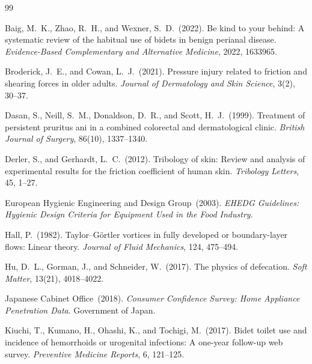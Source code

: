 \documentclass[aps,prfluids,reprint,amsmath,amssymb,floatfix]{revtex4-2}
\begin{document}
\begin{thebibliography}{99}

Baig, M.~K., Zhao, R.~H., and Wexner, S.~D.\ (2022).
Be kind to your behind: A systematic review of the habitual use of bidets
in benign perianal disease.
\textit{Evidence-Based Complementary and Alternative Medicine}, 2022, 1633965.

Broderick, J.~E., and Cowan, L.~J.\ (2021).
Pressure injury related to friction and shearing forces in older adults.
\textit{Journal of Dermatology and Skin Science}, 3(2), 30--37.

Dasan, S., Neill, S.~M., Donaldson, D.~R., and Scott, H.~J.\ (1999).
Treatment of persistent pruritus ani in a combined colorectal and
dermatological clinic.
\textit{British Journal of Surgery}, 86(10), 1337--1340.

Derler, S., and Gerhardt, L.~C.\ (2012).
Tribology of skin: Review and analysis of experimental results for the
friction coefficient of human skin.
\textit{Tribology Letters}, 45, 1--27.

European Hygienic Engineering and Design Group\ (2003).
\textit{EHEDG Guidelines: Hygienic Design Criteria for Equipment Used in
the Food Industry}.

Hall, P.\ (1982).
Taylor--G\"{o}rtler vortices in fully developed or boundary-layer flows:
Linear theory.
\textit{Journal of Fluid Mechanics}, 124, 475--494.

Hu, D.~L., Gorman, J., and Schneider, W.\ (2017).
The physics of defecation.
\textit{Soft Matter}, 13(21), 4018--4022.

Japanese Cabinet Office\ (2018).
\textit{Consumer Confidence Survey: Home Appliance Penetration Data}.
Government of Japan.

Kiuchi, T., Kumano, H., Ohashi, K., and Tochigi, M.\ (2017).
Bidet toilet use and incidence of hemorrhoids or urogenital infections:
A one-year follow-up web survey.
\textit{Preventive Medicine Reports}, 6, 121--125.


\end{thebibliography}
\end{document}
